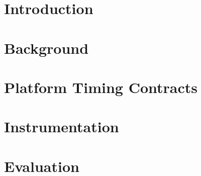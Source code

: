 \documentclass[conference]{IEEEtran}
\begin{document}
\maketitle

\begin{abstract}

\end{abstract}


\section{Introduction} \label{sec:introduction}


\section{Background} \label{sec:background}


\section{Platform Timing Contracts} \label{sec:reentrant}


\section{Instrumentation} \label{sec:instrumentation}


\section{Evaluation} \label{sec:evaluation}

\end{document}
